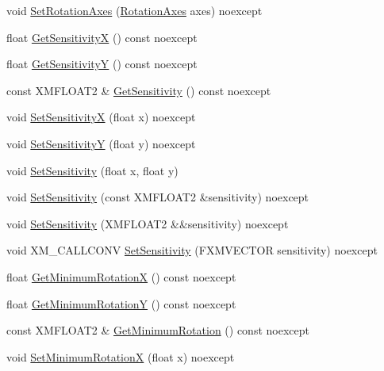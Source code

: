 \begin{DoxyCompactItemize}
\item 
void \hyperlink{classmage_1_1_mouse_look_script_ac0fbe4b4661fd7f3c78207a336624670}{Set\+Rotation\+Axes} (\hyperlink{classmage_1_1_mouse_look_script_af63fd955f796c11e0378813e5d1ab5f8}{Rotation\+Axes} axes) noexcept
\item 
float \hyperlink{classmage_1_1_mouse_look_script_a3aec50fa8f0a38878a1977797db3015f}{Get\+SensitivityX} () const noexcept
\item 
float \hyperlink{classmage_1_1_mouse_look_script_a4dd528a4a0631acf1f8b64b6039f72b0}{Get\+SensitivityY} () const noexcept
\item 
const X\+M\+F\+L\+O\+A\+T2 \& \hyperlink{classmage_1_1_mouse_look_script_ac4834dacc6d80a83faaa4e3c3c236ae8}{Get\+Sensitivity} () const noexcept
\item 
void \hyperlink{classmage_1_1_mouse_look_script_a3acf0b2991234849fbf9256bb4fe48d4}{Set\+SensitivityX} (float x) noexcept
\item 
void \hyperlink{classmage_1_1_mouse_look_script_a3b92c0fd89b2fe82c7c688705ef24ee4}{Set\+SensitivityY} (float y) noexcept
\item 
void \hyperlink{classmage_1_1_mouse_look_script_ac53d16f789083f4d3fd43c0e75db8776}{Set\+Sensitivity} (float x, float y)
\item 
void \hyperlink{classmage_1_1_mouse_look_script_afcdd18f25a8d193e44f82fead1a814fc}{Set\+Sensitivity} (const X\+M\+F\+L\+O\+A\+T2 \&sensitivity) noexcept
\item 
void \hyperlink{classmage_1_1_mouse_look_script_a532715b6e11ee72a2bf76866457e69b2}{Set\+Sensitivity} (X\+M\+F\+L\+O\+A\+T2 \&\&sensitivity) noexcept
\item 
void X\+M\+\_\+\+C\+A\+L\+L\+C\+O\+NV \hyperlink{classmage_1_1_mouse_look_script_a909c1c584952bd0273972b6c68649e72}{Set\+Sensitivity} (F\+X\+M\+V\+E\+C\+T\+OR sensitivity) noexcept
\item 
float \hyperlink{classmage_1_1_mouse_look_script_a1961b562ee19c7575f3005a0b1c9bc07}{Get\+Minimum\+RotationX} () const noexcept
\item 
float \hyperlink{classmage_1_1_mouse_look_script_a4c2274d715404591ec3e4ae4ba7fb3e3}{Get\+Minimum\+RotationY} () const noexcept
\item 
const X\+M\+F\+L\+O\+A\+T2 \& \hyperlink{classmage_1_1_mouse_look_script_a9bfb1bd2c5f4b6b2163a40782b5ac7fd}{Get\+Minimum\+Rotation} () const noexcept
\item 
void \hyperlink{classmage_1_1_mouse_look_script_a480b68fb46a6b61fa4eb372843f33258}{Set\+Minimum\+RotationX} (float x) noexcept

\end{DoxyCompactItemize}

